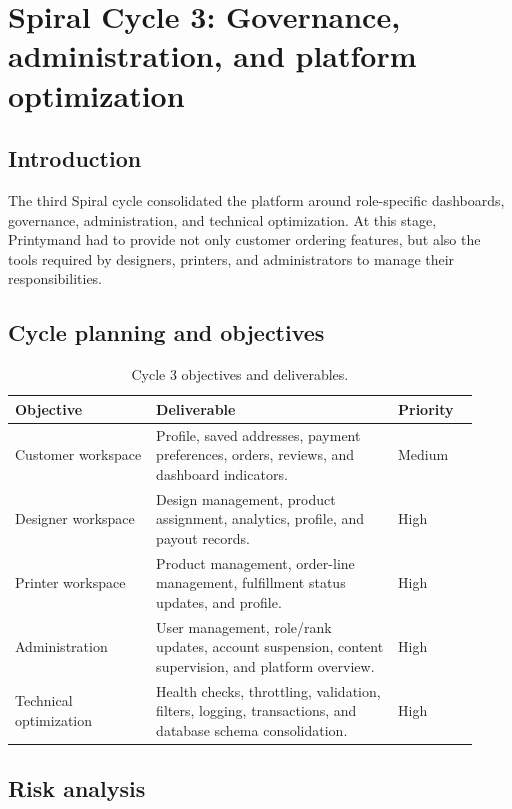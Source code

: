 \chapter{Spiral Cycle 3: Governance, administration, and platform optimization}
\label{ch::chapter6}

\section{Introduction}
The third Spiral cycle consolidated the platform around role-specific dashboards, governance, administration, and technical optimization.
At this stage, Printymand had to provide not only customer ordering features, but also the tools required by designers, printers, and administrators to manage their responsibilities.

\section{Cycle planning and objectives}
\begin{table}[!htpb]
\caption{Cycle 3 objectives and deliverables.}
\centering
\begin{tabular}{|p{0.28\linewidth}|p{0.48\linewidth}|p{0.16\linewidth}|}
\hline
\textbf{Objective} & \textbf{Deliverable} & \textbf{Priority} \\ \hline
Customer workspace & Profile, saved addresses, payment preferences, orders, reviews, and dashboard indicators. & Medium \\ \hline
Designer workspace & Design management, product assignment, analytics, profile, and payout records. & High \\ \hline
Printer workspace & Product management, order-line management, fulfillment status updates, and profile. & High \\ \hline
Administration & User management, role/rank updates, account suspension, content supervision, and platform overview. & High \\ \hline
Technical optimization & Health checks, throttling, validation, filters, logging, transactions, and database schema consolidation. & High \\ \hline
\end{tabular}
\label{tab:cycle3_objectives}
\end{table}

\section{Risk analysis}
